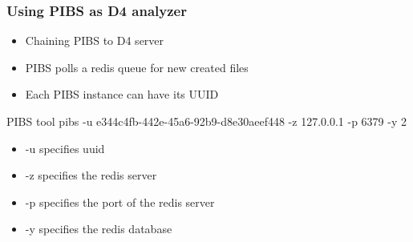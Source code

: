 \documentclass{beamer}
\begin{document}
\begin{frame}
    \frametitle{Using PIBS as D4 analyzer}
    \begin{itemize}
        \item Chaining PIBS to D4 server
        \item PIBS polls a redis queue for new created files
        \item Each PIBS instance can have its UUID
    \end{itemize}
    \begin{block}{PIBS tool}
        pibs -u e344c4fb-442e-45a6-92b9-d8e30aeef448 -z 127.0.0.1 -p 6379 -y 2
    \end{block}
    \begin{itemize}
        \item -u specifies uuid
        \item -z specifies the redis server
        \item -p specifies the port of the redis server
        \item -y specifies the redis database
    \end{itemize}
\end{frame}
\end{document}
